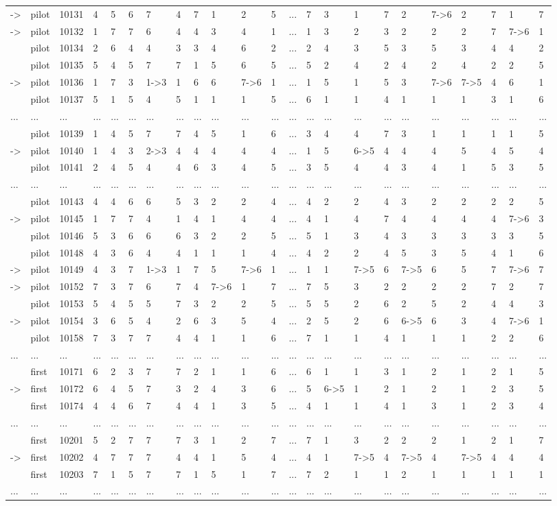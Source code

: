 \begin{landscape}
{\begin{longtable}{lllllllllllllllllllllll}
-\textgreater &pilot&10131&4&5&6&7&4&7&1&2&5&...&7&3&1&7&2&7-\textgreater 6&2&7&1&7\tabularnewline
-\textgreater &pilot&10132&1&7&7&6&4&4&3&4&1&...&1&3&2&3&2&2&2&7&7-\textgreater 6&1\tabularnewline
&pilot&10134&2&6&4&4&3&3&4&6&2&...&2&4&3&5&3&5&3&4&4&2\tabularnewline
&pilot&10135&5&4&5&7&7&1&5&6&5&...&5&2&4&2&4&2&4&2&2&5\tabularnewline
-\textgreater &pilot&10136&1&7&3&1-\textgreater 3&1&6&6&7-\textgreater 6&1&...&1&5&1&5&3&7-\textgreater 6&7-\textgreater 5&4&6&1\tabularnewline
&pilot&10137&5&1&5&4&5&1&1&1&5&...&6&1&1&4&1&1&1&3&1&6\tabularnewline
...&...&...&...&...&...&...&...&...&...&...&...&...&...&...&...&...&...&...&...&...&...&...\tabularnewline
&pilot&10139&1&4&5&7&7&4&5&1&6&...&3&4&4&7&3&1&1&1&1&5\tabularnewline
-\textgreater &pilot&10140&1&4&3&2-\textgreater 3&4&4&4&4&4&...&1&5&6-\textgreater 5&4&4&4&5&4&5&4\tabularnewline
&pilot&10141&2&4&5&4&4&6&3&4&5&...&3&5&4&4&3&4&1&5&3&5\tabularnewline
...&...&...&...&...&...&...&...&...&...&...&...&...&...&...&...&...&...&...&...&...&...&...\tabularnewline
&pilot&10143&4&4&6&6&5&3&2&2&4&...&4&2&2&4&3&2&2&2&2&5\tabularnewline
-\textgreater &pilot&10145&1&7&7&4&1&4&1&4&4&...&4&1&4&7&4&4&4&4&7-\textgreater 6&3\tabularnewline
&pilot&10146&5&3&6&6&6&3&2&2&5&...&5&1&3&4&3&3&3&3&3&5\tabularnewline
&pilot&10148&4&3&6&4&4&1&1&1&4&...&4&2&2&4&5&3&5&4&1&6\tabularnewline
-\textgreater &pilot&10149&4&3&7&1-\textgreater 3&1&7&5&7-\textgreater 6&1&...&1&1&7-\textgreater 5&6&7-\textgreater 5&6&5&7&7-\textgreater 6&7\tabularnewline
-\textgreater &pilot&10152&7&3&7&6&7&4&7-\textgreater 6&1&7&...&7&5&3&2&2&2&2&7&2&7\tabularnewline
&pilot&10153&5&4&5&5&7&3&2&2&5&...&5&5&2&6&2&5&2&4&4&3\tabularnewline
-\textgreater &pilot&10154&3&6&5&4&2&6&3&5&4&...&2&5&2&6&6-\textgreater 5&6&3&4&7-\textgreater 6&1\tabularnewline
&pilot&10158&7&3&7&7&4&4&1&1&6&...&7&1&1&4&1&1&1&2&2&6\tabularnewline
...&...&...&...&...&...&...&...&...&...&...&...&...&...&...&...&...&...&...&...&...&...&...\tabularnewline
&first&10171&6&2&3&7&7&2&1&1&6&...&6&1&1&3&1&2&1&2&1&5\tabularnewline
-\textgreater &first&10172&6&4&5&7&3&2&4&3&6&...&5&6-\textgreater 5&1&2&1&2&1&2&3&5\tabularnewline
&first&10174&4&4&6&7&4&4&1&3&5&...&4&1&1&4&1&3&1&2&3&4\tabularnewline
...&...&...&...&...&...&...&...&...&...&...&...&...&...&...&...&...&...&...&...&...&...&...\tabularnewline
&first&10201&5&2&7&7&7&3&1&2&7&...&7&1&3&2&2&2&1&2&1&7\tabularnewline
-\textgreater &first&10202&4&7&7&7&4&4&1&5&4&...&4&1&7-\textgreater 5&4&7-\textgreater 5&4&7-\textgreater 5&4&4&4\tabularnewline
&first&10203&7&1&5&7&7&1&5&1&7&...&7&2&1&1&2&1&1&1&1&1\tabularnewline
...&...&...&...&...&...&...&...&...&...&...&...&...&...&...&...&...&...&...&...&...&...&...\tabularnewline

\end{longtable}}
\end{landscape}
